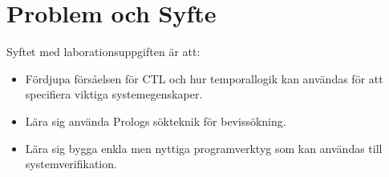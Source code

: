 \section{Problem och Syfte}
Syftet med laborationsuppgiften är att:

\begin{itemize}

\item Fördjupa försåelsen för CTL och hur temporallogik kan användas för att specifiera viktiga systemegenskaper.

\item Lära sig använda Prologs sökteknik för bevissökning.

\item Lära sig bygga enkla men nyttiga programverktyg som kan användas till systemverifikation.

\end{itemize}
